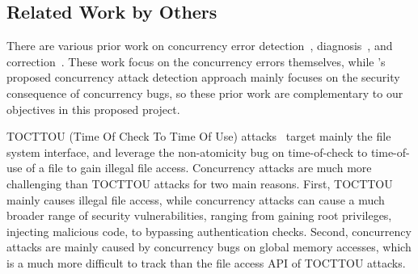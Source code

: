 


\subsection{Related Work by Others} \label{sec:others-work}

 There are various prior work on concurrency error 
detection~\cite{yu:racetrack:sosp,savage:eraser,racerx:sosp03,lu:muvi:sosp,
avio:asplos06,conmem:asplos10}, diagnosis~\cite{racefuzzer:pldi08,
ctrigger:asplos09,atomfuzzer:fse08}, 
and correction~\cite{dimmunix:osdi08,gadara:osdi08,wu:loom:osdi10,cfix:osdi12}. 
These work focus on the concurrency errors themselves, while \xxx's 
proposed concurrency attack detection approach mainly focuses on the security 
consequence of concurrency bugs, so these prior work are complementary to our 
objectives in this proposed project.

 TOCTTOU (Time Of Check To Time Of Use) 
attacks~\cite{bishop:tocttou,toctou:fast08,toctou:fast05,toctou:usec03} target 
mainly the file system interface, and leverage the non-atomicity bug on 
time-of-check to time-of-use of a file to gain illegal file access. Concurrency 
attacks are much more challenging than TOCTTOU attacks for two main reasons. 
First, TOCTTOU mainly causes illegal file access, while concurrency attacks can 
cause a much broader range of security vulnerabilities, ranging from gaining 
root privileges, injecting malicious code, to bypassing authentication checks. 
Second, concurrency attacks are mainly caused by concurrency bugs 
on global memory accesses, which is a much more difficult to track than the 
file access API of TOCTTOU attacks.

